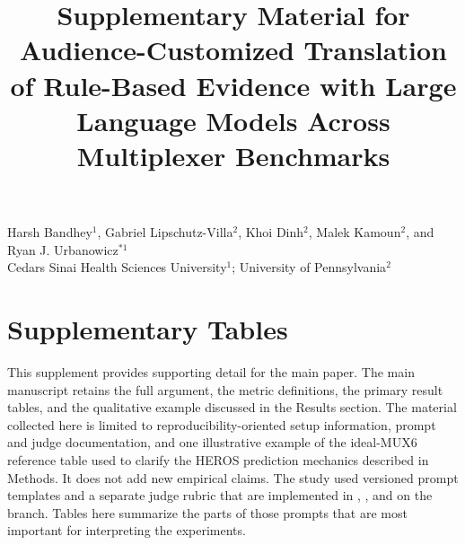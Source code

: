 \documentclass[11pt]{article}
\title{Supplementary Material for Audience-Customized Translation of Rule-Based Evidence with Large Language Models Across Multiplexer Benchmarks}
\author{}
\date{}
\begin{document}
\maketitle

\begin{center}
Harsh Bandhey$^1$, Gabriel Lipschutz-Villa$^2$, Khoi Dinh$^2$, Malek Kamoun$^2$, and Ryan J. Urbanowicz$^{*1}$\\
Cedars Sinai Health Sciences University$^1$; University of Pennsylvania$^2$
\end{center}

\section{Supplementary Tables}
This supplement provides supporting detail for the main paper. The main manuscript retains the full argument, the metric definitions, the primary result tables, and the qualitative example discussed in the Results section. The material collected here is limited to reproducibility-oriented setup information, prompt and judge documentation,  and one illustrative example of the ideal-MUX6 reference table used to clarify the HEROS prediction mechanics described in Methods. It does not add new empirical claims. The study used versioned prompt templates and a separate judge rubric that are implemented in , , and  on the  branch. Tables here summarize the parts of those prompts that are most important for interpreting the experiments.
\end{document}
